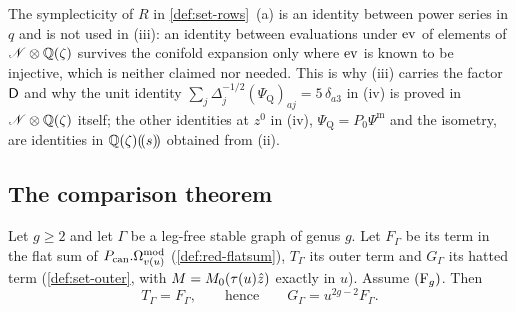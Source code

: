 The symplecticity of $R$ in \cref{def:set-rows}~(a) is an identity between power series in $q$ and is not used in (iii): an identity between evaluations under $\operatorname{ev}$ of elements of $\mathscr{N}\otimes\mathbb{Q}(\zeta)$ survives the conifold expansion only where $\operatorname{ev}$ is known to be injective, which is neither claimed nor needed. This is why (iii) carries the factor $\mathsf{D}$ and why the unit identity $\sum_j\Delta_j^{-1/2}(\Psi_{\mathrm Q})_{aj}=5\,\delta_{a3}$ in (iv) is proved in $\mathscr{N}\otimes\mathbb{Q}(\zeta)$ itself; the other identities at $z^0$ in (iv), $\Psi_{\mathrm Q}=P_0\Psi^{\mathrm m}$ and the isometry, are identities in $\mathbb{Q}(\zeta)(\!(s)\!)$ obtained from (ii).

\subsection{The comparison theorem}
\label{sec:flh-thm}

\begin{thm}
\label{thm:flh-main}
Let $g\geq 2$ and let $\Gamma$ be a leg-free stable graph of genus $g$. Let $F_\Gamma$ be its term in the flat sum of $P_{\mathrm{can}}.\Omega^{\mathrm{mod}}_{v(u)}$ (\cref{def:red-flatsum}), $T_\Gamma$ its outer term and $G_\Gamma$ its hatted term (\cref{def:set-outer}, with $M=M_{0}(\tau(u)\hat{z})$ exactly in $u$). Assume $(\mathrm{F}_{g})$. Then
\begin{equation}
\label{eq:flh-main}
T_\Gamma=F_\Gamma,\qquad\text{hence}\qquad G_\Gamma=u^{2g-2}F_\Gamma .
\end{equation}
\end{thm}

